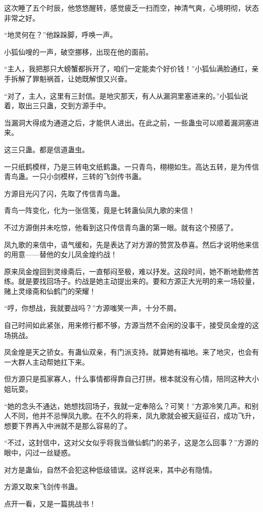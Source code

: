 \begin{this_body}
这次睡了五个时辰，他悠悠醒转，感觉疲乏一扫而空，神清气爽，心境明彻，状态非常之好。

“地灵何在？”他跺跺脚，呼唤一声。

小狐仙嗖的一声，破空挪移，出现在他的面前。

“主人，我把那只大螃蟹都拆开了，咱们一定能卖个好价钱！”小狐仙满脸通红，亲手拆解了罪魁祸首，让她既解恨又兴奋。

“对了，主人，这里有三封信。是地灾那天，有人从漏洞里塞进来的。”小狐仙说着，取出三只蛊，交到方源手中。

当漏洞大得成为通道之后，才能供人进出。在此之前，一些蛊虫可以顺着漏洞塞进来。

这三只蛊。都是信道蛊虫。

一只纸鹤模样，乃是三转电文纸鹤蛊。一只青鸟，栩栩如生。高达五转，是为传信青鸟蛊。一只小剑模样，三转的飞剑传书蛊。

方源目光闪了闪，先取了传信青鸟蛊。

青鸟一阵变化，化为一张信笺，竟是七转蛊仙凤九歌的来信！

不过方源倒并未吃惊，他看到这只传信青鸟蛊的第一眼。就有这个预感了。

凤九歌的来信中，语气缓和，先是表达了对方源的赞赏及恭喜。然后才说明他来信的用意——替他的女儿凤金煌约战！

原来凤金煌回到灵缘斋后，一直郁闷至极，难以抒发。这段时间，她不断地勤修苦练。就是要找回场子。约战是她主动提出来的。要和方源正大光明的来一场较量，赌上灵缘斋和仙鹤门的荣耀！

“哼，你想战，我就要战吗？”方源嗤笑一声，十分不屑。

自己时间如此紧张，用来修行都不够，方源当然不会闲的没事干，接受凤金煌的这场挑战。

凤金煌是天之骄女。有蛊仙双亲，有门派支持。就算她有福地。来了地灾，也会有一大群人主动帮她扛下来。

但方源只是孤家寡人，什么事情都得靠自己打拼。根本就没有心情，陪同这种大小姐玩耍。

“她的念头不通达，她想找回场子，我就一定奉陪么？可笑！”方源冷笑几声。和别人不同，他并不忌惮凤九歌。在不久的将来，凤九歌就会被天庭征召，成功飞升，想要下界再入中洲就不是那么容易的了。

“不过，这封信中，这对父女似乎将我当做仙鹤门的弟子，这是怎么回事？”方源的眼中，闪过一丝疑惑。

对方是蛊仙，自然不会犯这种低级错误。这样说来，其中必有隐情。

方源又取来飞剑传书蛊。

点开一看，又是一篇挑战书！


\end{this_body}

